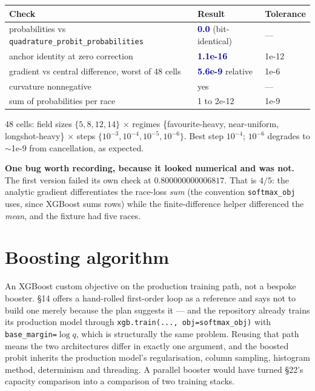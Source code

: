 \documentclass[11pt,a4paper]{article}
\newcommand{\good}[1]{\textcolor{darkblue}{\textbf{#1}}}
\begin{document}
\begin{center}\small
\begin{tabular}{lll}
\toprule
Check & Result & Tolerance \\
\midrule
probabilities vs \texttt{quadrature\_probit\_probabilities} & \good{0.0} (bit-identical) & --- \\
anchor identity at zero correction & \good{1.1e-16} & 1e-12 \\
gradient vs central difference, worst of 48 cells & \good{5.6e-9} relative & 1e-6 \\
curvature nonnegative & yes & --- \\
sum of probabilities per race & 1 to 2e-12 & 1e-9 \\
\bottomrule
\end{tabular}
\end{center}

48 cells: field sizes $\{5,8,12,14\}$ $\times$ regimes \{favourite-heavy, near-uniform,
longshot-heavy\} $\times$ steps $\{10^{-3},10^{-4},10^{-5},10^{-6}\}$. Best step $10^{-4}$;
$10^{-6}$ degrades to $\sim$1e-9 from cancellation, as expected.

\textbf{One bug worth recording, because it looked numerical and was not.} The first version
failed its own check at $0.800000000006817$. That is $4/5$: the analytic gradient differentiates
the race-loss \emph{sum} (the convention \texttt{softmax\_obj} uses, since XGBoost sums rows)
while the finite-difference helper differenced the \emph{mean}, and the fixture had five races.

\section{Boosting algorithm}

An XGBoost custom objective on the production training path, not a bespoke booster. §14 offers
a hand-rolled first-order loop as a reference and says not to build one merely because the plan
suggests it --- and the repository already trains its production model through
\texttt{xgb.train(..., obj=softmax\_obj)} with \texttt{base\_margin=$\log q$}, which is
structurally the same problem. Reusing that path means the two architectures differ in exactly
one argument, and the boosted probit inherits the production model's regularisation, column
sampling, histogram method, determinism and threading. A parallel booster would have turned
§22's capacity comparison into a comparison of two training stacks.
\end{document}
